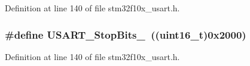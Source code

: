 Definition at line 140 of file stm32f10x\+\_\+usart.\+h.

\subsubsection[{\texorpdfstring{U\+S\+A\+R\+T\+\_\+\+Stop\+Bits\+\_\+2}{USART_StopBits_2}}]{\setlength{\rightskip}{0pt plus 5cm}\#define U\+S\+A\+R\+T\+\_\+\+Stop\+Bits\+\_~(({\bf uint16\+\_\+t})0x2000)}\hypertarget{group___u_s_a_r_t___stop___bits_ga652058b6be2f48ac0d82d0e75537fc81}{}\label{group___u_s_a_r_t___stop___bits_ga652058b6be2f48ac0d82d0e75537fc81}


Definition at line 140 of file stm32f10x\+\_\+usart.\+h.

